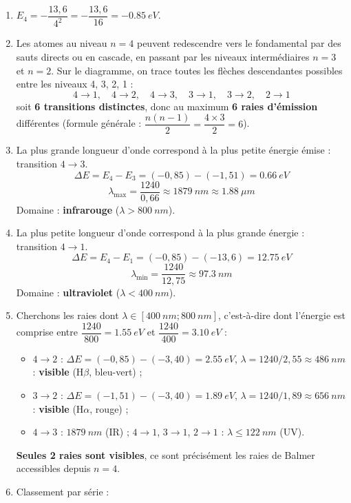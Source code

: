 \documentclass[11pt]{article}
\begin{document}
\begin{corrige}[Exercice 10 — Type Bac : désexcitation depuis le niveau $n = 4$]
\begin{enumerate}
\item $E_4 = -\dfrac{13,6}{4^2} = -\dfrac{13,6}{16} = \SI{-0,85}{eV}$.
\item Les atomes au niveau $n = 4$ peuvent redescendre vers le fondamental par des sauts directs ou en cascade, en passant par les niveaux intermédiaires $n = 3$ et $n = 2$. Sur le diagramme, on trace toutes les flèches descendantes possibles entre les niveaux 4, 3, 2, 1 :
\[
4\to1, \quad 4\to2, \quad 4\to3, \quad 3\to1, \quad 3\to2, \quad 2\to1
\]
soit \textbf{6 transitions distinctes}, donc au maximum \textbf{6 raies d'émission} différentes (formule générale : $\dfrac{n(n-1)}{2} = \dfrac{4\times 3}{2} = 6$).
\item La plus grande longueur d'onde correspond à la plus petite énergie émise : transition $4 \to 3$.
\[
\Delta E = E_4 - E_3 = (-0,85) - (-1,51) = \SI{0,66}{eV}
\]
\[
\lambda_{\max} = \frac{1240}{0,66} \approx \SI{1879}{nm} \approx \SI{1,88}{\mu m}
\]
Domaine : \textbf{infrarouge} ($\lambda > \SI{800}{nm}$).
\item La plus petite longueur d'onde correspond à la plus grande énergie : transition $4 \to 1$.
\[
\Delta E = E_4 - E_1 = (-0,85) - (-13,6) = \SI{12,75}{eV}
\]
\[
\lambda_{\min} = \frac{1240}{12,75} \approx \SI{97,3}{nm}
\]
Domaine : \textbf{ultraviolet} ($\lambda < \SI{400}{nm}$).
\item Cherchons les raies dont $\lambda \in [\SI{400}{nm} ; \SI{800}{nm}]$, c'est-à-dire dont l'énergie est comprise entre $\dfrac{1240}{800} = \SI{1,55}{eV}$ et $\dfrac{1240}{400} = \SI{3,10}{eV}$ :
\begin{itemize}
\item $4\to2$ : $\Delta E = (-0,85)-(-3,40) = \SI{2,55}{eV}$, $\lambda = 1240/2,55 \approx \SI{486}{nm}$ : \textbf{visible} (H$\beta$, bleu-vert) ;
\item $3\to2$ : $\Delta E = (-1,51)-(-3,40) = \SI{1,89}{eV}$, $\lambda = 1240/1,89 \approx \SI{656}{nm}$ : \textbf{visible} (H$\alpha$, rouge) ;
\item $4\to3$ : $\SI{1879}{nm}$ (IR) ; $4\to1$, $3\to1$, $2\to1$ : $\lambda \leq \SI{122}{nm}$ (UV).
\end{itemize}
\textbf{Seules 2 raies sont visibles}, ce sont précisément les raies de Balmer accessibles depuis $n = 4$.
\item Classement par série :
\begin{itemize}

\end{itemize}
\end{enumerate}
\end{corrige}
\end{document}
